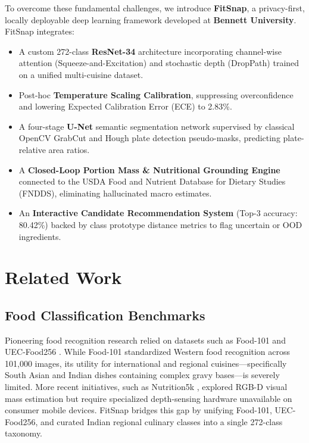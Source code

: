 \documentclass[conference]{IEEEtran}
\begin{document}
To overcome these fundamental challenges, we introduce \textbf{FitSnap}, a privacy-first, locally deployable deep learning framework developed at \textbf{Bennett University}. FitSnap integrates:
\begin{itemize}
    \item A custom 272-class \textbf{ResNet-34} architecture incorporating channel-wise attention (Squeeze-and-Excitation) and stochastic depth (DropPath) trained on a unified multi-cuisine dataset.
    \item Post-hoc \textbf{Temperature Scaling Calibration}, suppressing overconfidence and lowering Expected Calibration Error (ECE) to 2.83\%.
    \item A four-stage \textbf{U-Net} semantic segmentation network supervised by classical OpenCV GrabCut and Hough plate detection pseudo-masks, predicting plate-relative area ratios.
    \item A \textbf{Closed-Loop Portion Mass \& Nutritional Grounding Engine} connected to the USDA Food and Nutrient Database for Dietary Studies (FNDDS), eliminating hallucinated macro estimates.
    \item An \textbf{Interactive Candidate Recommendation System} (Top-3 accuracy: 80.42\%) backed by class prototype distance metrics to flag uncertain or OOD ingredients.
\end{itemize}

\section{Related Work}
\subsection{Food Classification Benchmarks}
Pioneering food recognition research relied on datasets such as Food-101 \cite{bossard2014} and UEC-Food256 \cite{kawano2014}. While Food-101 standardized Western food recognition across 101,000 images, its utility for international and regional cuisines—specifically South Asian and Indian dishes containing complex gravy bases—is severely limited. More recent initiatives, such as Nutrition5k \cite{thames2021}, explored RGB-D visual mass estimation but require specialized depth-sensing hardware unavailable on consumer mobile devices. FitSnap bridges this gap by unifying Food-101, UEC-Food256, and curated Indian regional culinary classes into a single 272-class taxonomy.
\end{document}
